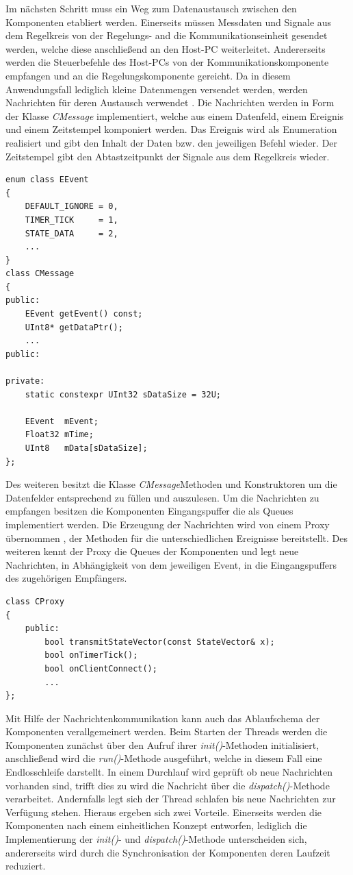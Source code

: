 Im nächsten Schritt muss ein Weg zum Datenaustausch zwischen den Komponenten etabliert werden. Einerseits müssen Messdaten und Signale aus dem Regelkreis von der Regelungs- and die Kommunikationseinheit gesendet werden, welche diese anschließend an den Host-PC weiterleitet. Andererseits werden die Steuerbefehle des Host-PCs von der Kommunikationskomponente empfangen und an die Regelungskomponente gereicht. Da in diesem Anwendungsfall lediglich kleine Datenmengen versendet werden, werden Nachrichten für deren Austausch verwendet \cite[S. 196]{Wietzke1}. Die Nachrichten werden in Form der Klasse \textit{CMessage} implementiert, welche aus einem Datenfeld, einem Ereignis und einem Zeitstempel komponiert werden. Das Ereignis wird als Enumeration realisiert und gibt den Inhalt der Daten bzw. den jeweiligen Befehl wieder. Der Zeitstempel gibt den Abtastzeitpunkt der Signale aus dem Regelkreis wieder. 
\begin{lstlisting}[caption={Beispielhafte Implementierung der Events und Nachrichten},captionpos=b]
enum class EEvent
{
	DEFAULT_IGNORE = 0,
	TIMER_TICK     = 1,
	STATE_DATA     = 2,
	...
}
class CMessage
{
public:
	EEvent getEvent() const;
	UInt8* getDataPtr();
	...
public:

private:
	static constexpr UInt32 sDataSize = 32U;

	EEvent  mEvent;
	Float32 mTime;	
	UInt8   mData[sDataSize];
};
\end{lstlisting}
Des weiteren besitzt die Klasse \textit{CMessage}Methoden und Konstruktoren um die Datenfelder entsprechend zu füllen und auszulesen. Um die Nachrichten zu empfangen besitzen die Komponenten Eingangspuffer die als Queues implementiert werden. Die Erzeugung der Nachrichten wird von einem Proxy übernommen \cite[S. 285 ff.]{Wietzke1}, der Methoden für die unterschiedlichen Ereignisse bereitstellt. Des weiteren kennt der Proxy die Queues der Komponenten und legt neue Nachrichten, in Abhängigkeit von dem jeweiligen Event, in die Eingangspuffers des zugehörigen Empfängers.
\begin{lstlisting}[caption={Aufbau der Proxy-Klasse},captionpos=b]
class CProxy
{
	public:
		bool transmitStateVector(const StateVector& x);
		bool onTimerTick();
		bool onClientConnect();
		...
};
\end{lstlisting}
Mit Hilfe der Nachrichtenkommunikation kann auch das Ablaufschema der Komponenten verallgemeinert werden. Beim Starten der Threads werden die Komponenten zunächst über den Aufruf ihrer \textit{init()}-Methoden initialisiert, anschließend wird die \textit{run()}-Methode ausgeführt, welche in diesem Fall eine Endlosschleife darstellt. In einem Durchlauf wird geprüft ob neue Nachrichten vorhanden sind, trifft dies zu wird die Nachricht über die \textit{dispatch()}-Methode verarbeitet. Andernfalls legt sich der Thread schlafen bis neue Nachrichten zur Verfügung stehen. Hieraus ergeben sich zwei Vorteile. Einerseits werden die Komponenten nach einem einheitlichen Konzept entworfen, lediglich die Implementierung der \textit{init()}- und \textit{dispatch()}-Methode unterscheiden sich, andererseits wird durch die Synchronisation der Komponenten deren Laufzeit reduziert.